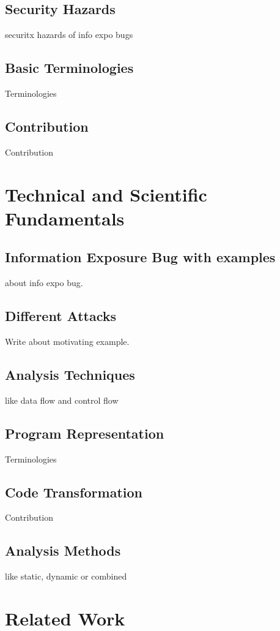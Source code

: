\section{Security Hazards}
securitx hazards of info expo bugs
 
\section{Basic Terminologies}
Terminologies

\section{Contribution}
Contribution




\chapter{Technical and Scientific Fundamentals}
\label{chapter:Technical}

\section{Information Exposure Bug with examples}
about info expo bug.
 
 \section{Different Attacks}
Write about motivating example.

\section{Analysis Techniques}
like data flow and control flow

\section{Program Representation}
Terminologies

\section{Code Transformation}
Contribution

\section{Analysis Methods}
like static, dynamic or combined

\chapter{Related Work}
\label{chapter:related}